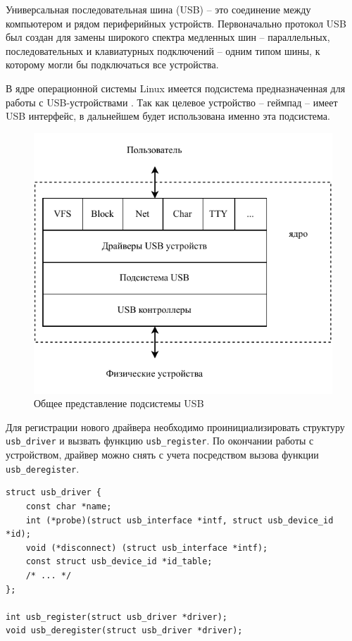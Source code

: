 Универсальная последовательная шина (USB) -- это соединение между компьютером и рядом периферийных устройств. Первоначально протокол USB был создан для замены широкого спектра медленных шин -- параллельных, последовательных и клавиатурных подключений -- одним типом шины, к которому могли бы подключаться все устройства.

В ядре операционной системы Linux имеется подсистема предназначенная для работы с USB-устройствами \cite{usb-basics}. Так как целевое устройство -- геймпад -- имеет USB интерфейс, в дальнейшем будет использована именно эта подсистема.

\begin{figure}[ht]
    \centering
    \includegraphics[width=0.8\linewidth]{img/usb-overview.pdf}
    \caption{Общее представление подсистемы USB}
\end{figure}

\clearpage

Для регистрации нового драйвера необходимо проинициализировать структуру \texttt{usb\_driver} и вызвать функцию \texttt{usb\_register}. По окончании работы с устройством, драйвер можно снять с учета посредством вызова функции \texttt{usb\_deregister}. 

\begin{small}
\begin{verbatim}
struct usb_driver {
    const char *name;
    int (*probe)(struct usb_interface *intf, struct usb_device_id *id);
    void (*disconnect) (struct usb_interface *intf);
    const struct usb_device_id *id_table;
    /* ... */
};

int usb_register(struct usb_driver *driver);
void usb_deregister(struct usb_driver *driver);
\end{verbatim}
\end{small}

